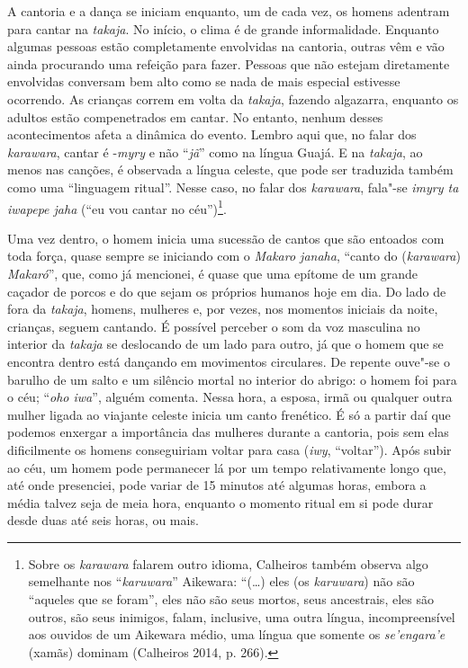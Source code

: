 A cantoria e a dança se iniciam enquanto, um de cada vez, os homens
adentram para cantar na \emph{takaja}. No início, o clima é de grande
informalidade. Enquanto algumas pessoas estão completamente envolvidas
na cantoria, outras vêm e vão ainda procurando uma refeição para fazer.
Pessoas que não estejam diretamente envolvidas conversam bem alto como
se nada de mais especial estivesse ocorrendo. As crianças correm em
volta da \emph{takaja}, fazendo algazarra, enquanto os adultos estão
compenetrados em cantar. No entanto, nenhum desses acontecimentos afeta
a dinâmica do evento. Lembro aqui que, no falar dos \emph{karawara},
cantar é -\emph{myry} e não ``\emph{jã}'' como na língua Guajá. E na
\emph{takaja}, ao menos nas canções, é observada a língua celeste, que
pode ser traduzida também como uma ``linguagem ritual''. Nesse caso, no
falar dos \emph{karawara}, fala"-se \emph{imyry ta iwapepe jaha} (``eu
vou cantar no céu'')\footnote{Sobre os \emph{karawara} falarem outro
  idioma, Calheiros também observa algo semelhante nos
  ``\emph{karuwara}'' Aikewara: ``(\ldots{}) eles (os \emph{karuwara}) não
  são ``aqueles que se foram'', eles não são seus mortos, seus
  ancestrais, eles são outros, são seus inimigos, falam, inclusive, uma
  outra língua, incompreensível aos ouvidos de um Aikewara médio, uma
  língua que somente os \emph{se'engara'e} (xamãs) dominam (Calheiros
  2014, p. 266).}.

Uma vez dentro, o homem inicia uma sucessão de cantos que são entoados
com toda força, quase sempre se iniciando com o \emph{Makaro janaha},
``canto do (\emph{karawara}) \emph{Makaró}'', que, como já mencionei, é
quase que uma epítome de um grande caçador de porcos e do que sejam os
próprios humanos hoje em dia. Do lado de fora da \emph{takaja}, homens,
mulheres e, por vezes, nos momentos iniciais da noite, crianças, seguem
cantando. É possível perceber o som da voz masculina no interior da
\emph{takaja} se deslocando de um lado para outro, já que o homem que se
encontra dentro está dançando em movimentos circulares. De repente
ouve"-se o barulho de um salto e um silêncio mortal no interior do
abrigo: o homem foi para o céu; ``\emph{oho iwa}'', alguém comenta.
Nessa hora, a esposa, irmã ou qualquer outra mulher ligada ao viajante
celeste inicia um canto frenético. É só a partir daí que podemos
enxergar a importância das mulheres durante a cantoria, pois sem elas
dificilmente os homens conseguiriam voltar para casa (\emph{iwy},
``voltar''). Após subir ao céu, um homem pode permanecer lá por um tempo
relativamente longo que, até onde presenciei, pode variar de 15 minutos
até algumas horas, embora a média talvez seja de meia hora, enquanto o
momento ritual em si pode durar desde duas até seis horas, ou mais.

